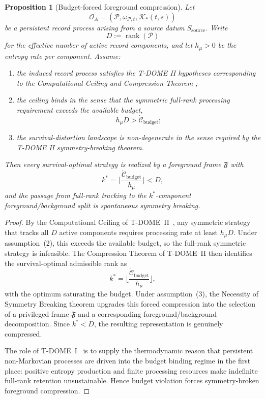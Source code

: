 \documentclass[12pt]{article}
\newtheorem{proposition}[theorem]{Proposition}
\theoremstyle{definition}
\theoremstyle{remark}
\begin{document}
\begin{proposition}[Budget-forced foreground compression]\label{prop:budget}
Let
\[
\mathcal O_A=(\mathcal P,\omega_{\mathcal P,t},\mathcal K_*(t,s))
\]
be a persistent record process arising from a source datum
\(S_{\mathrm{source}}\). Write
\[
D:=\operatorname{rank}(\mathcal P)
\]
for the effective number of active record components, and let
\(h_\mu>0\) be the entropy rate per component. Assume:
\begin{enumerate}
\item the induced record process satisfies the T-DOME II hypotheses
  corresponding to the Computational Ceiling and Compression Theorem
  \cite{TDOMEII};
\item the ceiling binds in the sense that the symmetric full-rank
  processing requirement exceeds the available budget,
  \[
  h_\mu D>\dot{\mathcal C}_{\mathrm{budget}};
  \]
\item the survival-distortion landscape is non-degenerate in the sense
  required by the T-DOME II symmetry-breaking theorem.
\end{enumerate}
Then every survival-optimal strategy is realized by a foreground frame
\(\mathfrak F\) with
\[
k^*
=
\Big\lfloor
\frac{\dot{\mathcal C}_{\mathrm{budget}}}{h_\mu}
\Big\rfloor
<D,
\]
and the passage from full-rank tracking to the
\(k^*\)-component foreground/background split is spontaneous symmetry
breaking.
\end{proposition}

\begin{proof}
By the Computational Ceiling of T-DOME~II~\cite{TDOMEII}, any symmetric
strategy that tracks all \(D\) active components requires processing
rate at least \(h_\mu D\). Under assumption~(2), this exceeds the
available budget, so the full-rank symmetric strategy is infeasible. The
Compression Theorem of T-DOME~II then identifies the survival-optimal
admissible rank as
\[
k^*
=
\Big\lfloor
\frac{\dot{\mathcal C}_{\mathrm{budget}}}{h_\mu}
\Big\rfloor,
\]
with the optimum saturating the budget. Under assumption~(3), the
Necessity of Symmetry Breaking theorem upgrades this forced compression
into the selection of a privileged frame \(\mathfrak F\) and a
corresponding foreground/background decomposition. Since \(k^*<D\), the
resulting representation is genuinely compressed.

The role of T-DOME~I~\cite{TDOMEI} is to supply the thermodynamic reason
that persistent non-Markovian processes are driven into the budget
binding regime in the first place: positive entropy production and
finite processing resources make indefinite full-rank retention
unsustainable. Hence budget violation forces symmetry-broken foreground
compression.
\end{proof}
\end{document}
